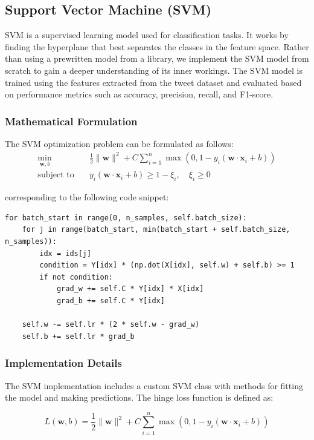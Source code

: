 \documentclass[12pt]{article}
\begin{document}
\subsection{Support Vector Machine (SVM)}
SVM is a supervised learning model used for classification tasks. It works by finding the hyperplane that best separates the classes in the feature space. Rather than using a prewritten model from a library, we implement the SVM model from scratch to gain a deeper understanding of its inner workings. The SVM model is trained using the features extracted from the tweet dataset and evaluated based on performance metrics such as accuracy, precision, recall, and F1-score.

\subsubsection{Mathematical Formulation}
The SVM optimization problem can be formulated as follows:
\begin{align}
\min_{\mathbf{w}, b} & \quad \frac{1}{2} \|\mathbf{w}\|^2 + C \sum_{i=1}^{n} \max(0, 1 - y_i (\mathbf{w} \cdot \mathbf{x}_i + b)) \\
\text{subject to} & \quad y_i (\mathbf{w} \cdot \mathbf{x}_i + b) \geq 1 - \xi_i, \quad \xi_i \geq 0
\end{align}

corresponding to the following code snippet:

\begin{verbatim}
for batch_start in range(0, n_samples, self.batch_size):
    for j in range(batch_start, min(batch_start + self.batch_size, n_samples)):
        idx = ids[j]
        condition = Y[idx] * (np.dot(X[idx], self.w) + self.b) >= 1
        if not condition:
            grad_w += self.C * Y[idx] * X[idx]
            grad_b += self.C * Y[idx]

    self.w -= self.lr * (2 * self.w - grad_w)
    self.b += self.lr * grad_b
\end{verbatim}

\subsubsection{Implementation Details}
The SVM implementation includes a custom SVM class with methods for fitting the model and making predictions. The hinge loss function is defined as:

\begin{equation}
L(\mathbf{w}, b) = \frac{1}{2} \|\mathbf{w}\|^2 + C \sum_{i=1}^{n} \max(0, 1 - y_i (\mathbf{w} \cdot \mathbf{x}_i + b))
\end{equation}
\end{document}
